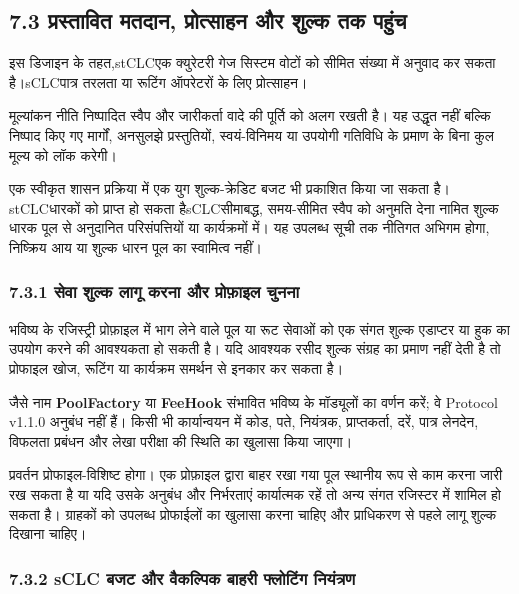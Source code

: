 \documentclass[11pt]{article}
\begin{document}
\subsection*{7.3 प्रस्तावित मतदान, प्रोत्साहन और शुल्क तक पहुंच}

इस डिजाइन के तहत,stCLCएक क्युरेटरी गेज सिस्टम वोटों को सीमित संख्या में अनुवाद कर सकता है।sCLCपात्र तरलता या रूटिंग ऑपरेटरों के लिए प्रोत्साहन।

मूल्यांकन नीति निष्पादित स्वैप और जारीकर्ता वादे की पूर्ति को अलग रखती है। यह उद्धृत नहीं बल्कि निष्पाद किए गए मार्गों, अनसुलझे प्रस्तुतियों, स्वयं-विनिमय या उपयोगी गतिविधि के प्रमाण के बिना कुल मूल्य को लॉक करेगी।

एक स्वीकृत शासन प्रक्रिया में एक युग शुल्क-क्रेडिट बजट भी प्रकाशित किया जा सकता है।stCLCधारकों को प्राप्त हो सकता हैsCLCसीमाबद्ध, समय-सीमित स्वैप को अनुमति देना नामित शुल्क धारक पूल से अनुदानित परिसंपत्तियों या कार्यक्रमों में। यह उपलब्ध सूची तक नीतिगत अभिगम होगा, निष्क्रिय आय या शुल्क धारन पूल का स्वामित्व नहीं।

\subsubsection*{7.3.1 सेवा शुल्क लागू करना और प्रोफ़ाइल चुनना}

भविष्य के रजिस्ट्री प्रोफ़ाइल में भाग लेने वाले पूल या रूट सेवाओं को एक संगत शुल्क एडाप्टर या हुक का उपयोग करने की आवश्यकता हो सकती है। यदि आवश्यक रसीद शुल्क संग्रह का प्रमाण नहीं देती है तो प्रोफाइल खोज, रूटिंग या कार्यक्रम समर्थन से इनकार कर सकता है।

जैसे नाम \textbf{PoolFactory } या \textbf{ FeeHook} संभावित भविष्य के मॉड्यूलों का वर्णन करें; वे Protocol v1.1.0 अनुबंध नहीं हैं। किसी भी कार्यान्वयन में कोड, पते, नियंत्रक, प्राप्तकर्ता, दरें, पात्र लेनदेन, विफलता प्रबंधन और लेखा परीक्षा की स्थिति का खुलासा किया जाएगा।

प्रवर्तन प्रोफाइल-विशिष्ट होगा। एक प्रोफ़ाइल द्वारा बाहर रखा गया पूल स्थानीय रूप से काम करना जारी रख सकता है या यदि उसके अनुबंध और निर्भरताएं कार्यात्मक रहें तो अन्य संगत रजिस्टर में शामिल हो सकता है। ग्राहकों को उपलब्ध प्रोफाईलों का खुलासा करना चाहिए और प्राधिकरण से पहले लागू शुल्क दिखाना चाहिए।

\subsubsection*{7.3.2 sCLC बजट और वैकल्पिक बाहरी फ्लोटिंग नियंत्रण}
\end{document}
